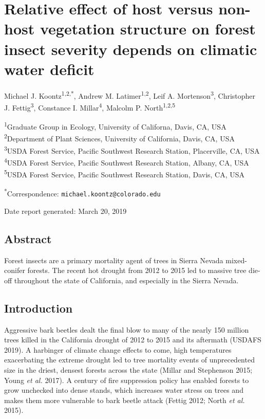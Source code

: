 \documentclass[]{article}
\title{}
\author{}
\date{}
\begin{document}
\section{Relative effect of host versus non-host vegetation structure on
forest insect severity depends on climatic water
deficit}\label{relative-effect-of-host-versus-non-host-vegetation-structure-on-forest-insect-severity-depends-on-climatic-water-deficit}

Michael J. Koontz\textsuperscript{1,2,*}, Andrew M.
Latimer\textsuperscript{1,2}, Leif A. Mortenson\textsuperscript{3},
Christopher J. Fettig\textsuperscript{3}, Constance I.
Millar\textsuperscript{4}, Malcolm P. North\textsuperscript{1,2,5}

\textsuperscript{1}Graduate Group in Ecology, University of Californa,
Davis, CA, USA\\
\textsuperscript{2}Department of Plant Sciences, University of
California, Davis, CA, USA\\
\textsuperscript{3}USDA Forest Service, Pacific Southwest Research
Station, Placerville, CA, USA\\
\textsuperscript{4}USDA Forest Service, Pacific Southwest Research
Station, Albany, CA, USA\\
\textsuperscript{5}USDA Forest Service, Pacific Southwest Research
Station, Davis, CA, USA

\textsuperscript{*}Correspondence: \texttt{michael.koontz@colorado.edu}

Date report generated: March 20, 2019

\subsection{Abstract}\label{abstract}

Forest insects are a primary mortality agent of trees in Sierra Nevada
mixed-conifer forests. The recent hot drought from 2012 to 2015 led to
massive tree die-off throughout the state of California, and especially
in the Sierra Nevada.

\subsection{Introduction}\label{introduction}

Aggressive bark beetles dealt the final blow to many of the nearly 150
million trees killed in the California drought of 2012 to 2015 and its
aftermath (USDAFS 2019). A harbinger of climate change effects to come,
high temperatures exacerbating the extreme drought led to tree mortality
events of unprecedented size in the driest, densest forests across the
state (Millar and Stephenson 2015; Young \emph{et al.} 2017). A century
of fire suppression policy has enabled forests to grow unchecked into
dense stands, which increases water stress on trees and makes them more
vulnerable to bark beetle attack (Fettig 2012; North \emph{et al.}
2015).
\end{document}
